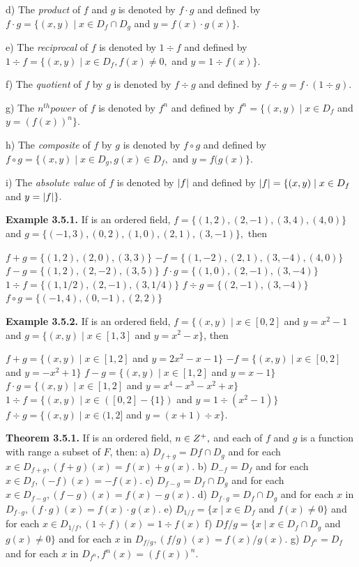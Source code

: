 \begin{large}
d) The \textit{product} of $f$ and $g$ is denoted by $f\cdot g$ and defined by $f\cdot g = \{(x,y) \mid x\in D_{f}\cap D_{g}$ and $y = f(x)\cdot g(x) \}. $\nl

e) The \textit{reciprocal} of $f$ is denoted by $1 \div f$ and defined by $1\div f =\{ (x,y) \mid x\in D_{f}, f(x) \neq 0,$ and $y = 1\div f(x) \}.$ \nl

f) The \textit{quotient} of $f$ by $g$ is denoted by $f\div g$ and defined by $f\div g =f\cdot (1 \div g).$ \nl

\newpage
g) The $n^{th} power$ of $f$ is denoted by $f^{n}$ and defined by $f^{n} = \{(x,y) \mid x\in D_{f}$ and $y=(f(x))^{n}\}.$ \nl

h) The \textit{composite} of $f$ by $g$ is denoted by $f\circ g$ and defined by $f\circ g = \{(x,y) \mid x\in D_{g}, g(x)\in D_{f},$ and $y = f(g(x)\}.$\nl

i) The \textit{absolute value} of $f$ is denoted by $\left|f\right|$ and defined by $\left|f\right| =\{(x,y) \mid x\in D_{f}$ and $y= \left|f\right|\}.$\nl


\textbf{Example 3.5.1.} If \of is an ordered field, $f = \{(1,2), (2,-1), (3,4), (4,0) \}$ and
$g =\{ (-1,3), (0,2), (1,0), (2,1), (3,-1) \},$ then \nl

$ f + g = \{ (1,2), (2,0), (3,3) \}$\nl
$-f = \{ (1,-2), (2,1), (3,-4), (4,0) \}$\nl
$f - g = \{ (1,2), (2,-2), (3,5) \}$\nl
$f\cdot g = \{(1,0), (2,-1), (3,-4) \}$\nl
$1\div f =\{ (1,1/2), (2,-1), (3,1/4) \}$\nl
$f\div g = \{ (2,-1), (3,-4) \}$\nl
$f\circ g = \{(-1,4), (0,-1), (2,2)\}$\nl

\textbf{Example 3.5.2.} If \of is an ordered field, $f = \{(x,y) \mid x\in [0,2]$ and $y =x^{2} - 1$ and $g =\{(x,y) \mid x\in [1,3]$ and $y = x^{2} - x \}$, then \nl

$f + g = \{ (x,y) \mid x\in [1,2]$ and $y =2x^{2} - x - 1\}$\nl
$-f = \{(x,y) \mid x\in [0,2]$ and $y = -x^{2}+1 \}$\nl
$f - g = \{ (x,y) \mid x\in [1,2]$ and $y = x - 1\}$\nl
$f\cdot g= \{ (x,y) \mid x\in [1,2]$ and $y = x^{4} -x^{3} -x^{2} +x \} $\nl
$1\div f= \{ (x,y) \mid x\in ([ 0,2] -\{1\} )$ and $y= 1 \div (x^{2} - 1) \}$\nl
$f\div g = \{(x,y) \mid x\in (1,2$] and $y = (x+1)\div x\}.$\nl



\textbf{Theorem 3.5.1.} If \of is an ordered field, $n\in Z^{+},$ and each of $f$ and $g$ is a function with range a subset of $F$, then: \nl
a) $D_{f+g} = D{f}\cap D_{g}$ and for each $x \in D_{f+g} , (f+g)(x)=f(x)+g(x).$\nl
b) $D_{-f} = D_{f} $ and for each $x \in D_{f} , (-f)(x)=-f(x).$\nl
c) $D_{f-g} = D_{f}\cap D_{g} $ and for each $x \in  D_{f-g}, (f-g)(x)=f(x)-g(x).$\nl
d) $D_{f\cdot g} = D_{f}\cap D_{g}$ and for each $x$ in $D_{f\cdot g} , (f\cdot g)(x)=f(x)\cdot g(x).$\nl
e) $D_{1/f} = \{x \mid x\in D_{f}$ and $f(x) \neq 0\} $ and for each $x \in D_{1/f}, (1 \div f)(x)= 1
\div f(x)$\nl
f) $D{f/g} = \{x \mid x\in D_{f}\cap D_{g}$  and $g(x)\neq 0\}$ and for each $x$ in $D_{f/g},
(f/g)(x)=f(x)/g(x). $\nl
g) $D_{f^{n}} =D_{f}$ and for each $x$ in $D_{f^{n}}, f^{n}(x)=(f(x))^{n}.$\nl


\end{large}
